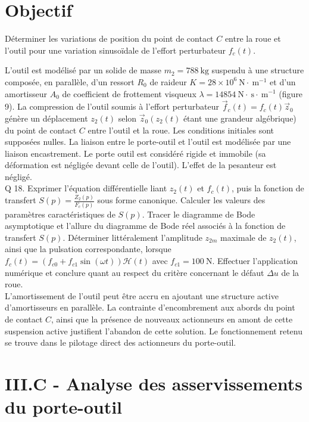 \documentclass[10pt]{article}
\begin{document}
\section*{Objectif}
Déterminer les variations de position du point de contact $C$ entre la roue et l'outil pour une variation sinusoïdale de l'effort perturbateur $f_{c}(t)$.

L'outil est modélisé par un solide de masse $m_{2}=788 \mathrm{~kg}$ suspendu à une structure composée, en parallèle, d'un ressort $R_{0}$ de raideur $K=28 \times 10^{6} \mathrm{~N} \cdot \mathrm{~m}^{-1}$ et d'un amortisseur $A_{0}$ de coefficient de frottement visqueux $\lambda=14854 \mathrm{~N} \cdot \mathrm{~s} \cdot \mathrm{~m}^{-1}$ (figure 9). La compression de l'outil soumis à l'effort perturbateur $\vec{f}_{c}(t)=f_{c}(t) \vec{z}_{0}$ génère un déplacement $z_{2}(t)$ selon $\vec{z}_{0}\left(z_{2}(t)\right.$ étant une grandeur algébrique) du point de contact $C$ entre l'outil et la roue. Les conditions initiales sont supposées nulles. La liaison entre le porte-outil et l'outil est modélisée par une liaison encastrement. Le porte outil est considéré rigide et immobile (sa déformation est négligée devant celle de l'outil). L'effet de la pesanteur est négligé.\\
Q 18. Exprimer l'équation différentielle liant $z_{2}(t)$ et $f_{c}(t)$, puis la fonction de transfert $S(p)=\frac{Z_{2}(p)}{F_{c}(p)}$ sous forme canonique. Calculer les valeurs des paramètres caractéristiques de $S(p)$. Tracer le diagramme de Bode asymptotique et l'allure du diagramme de Bode réel associés à la fonction de transfert $S(p)$. Déterminer littéralement l'amplitude $z_{2 m}$ maximale de $z_{2}(t)$, ainsi que la pulsation correspondante, lorsque $f_{c}(t)=\left(f_{c 0}+\right. \left.f_{c 1} \sin (\omega t)\right) \mathcal{H}(t)$ avec $f_{c 1}=100 \mathrm{~N}$. Effectuer l'application numérique et conclure quant au respect du critère concernant le défaut $\Delta u$ de la roue.\\
L'amortissement de l'outil peut être accru en ajoutant une structure active d'amortisseurs en parallèle. La contrainte d'encombrement aux abords du point de contact $C$, ainsi que la présence de nouveaux actionneurs en amont de cette suspension active justifient l'abandon de cette solution. Le fonctionnement retenu se trouve dans le pilotage direct des actionneurs du porte-outil.

\section*{III.C - Analyse des asservissements du porte-outil}
\end{document}
